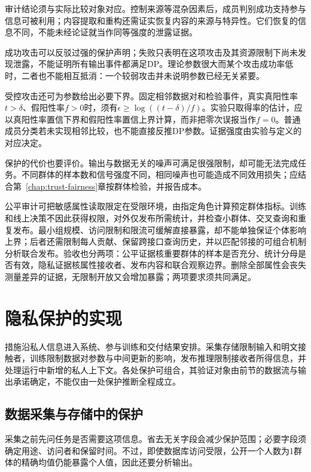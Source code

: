 审计结论须与实际比较对象对应。控制来源等混杂因素后，成员判别成功支持参与信息可被利用；内容提取和重构还需证实恢复内容的来源与特异性。它们恢复的信息不同，不能未经论证就当作同等强度的泄露证据。

成功攻击可以反驳过强的保护声明；失败只表明在这项攻击及其资源限制下尚未发现泄露，不能证明所有输出事件都满足DP。理论参数很大而某个攻击成功率低时，二者也不能相互抵消：一个较弱攻击并未说明参数已经无关紧要。

受控攻击还可为参数给出必要下界。固定相邻数据对和检验事件，真实真阳性率$t>\delta$、假阳性率$f>0$时，须有$\epsilon\geq\log((t-\delta)/f)$。实验只取得率的估计，应以真阳性率置信下界和假阳性率置信上界计算，而非把零次误报当作$f=0$。普通成员分类若未实现相邻比较，也不能直接反推DP参数。证据强度由实验与定义的对应决定。

保护的代价也要评价。输出与数据无关的噪声可满足很强限制，却可能无法完成任务。不同群体的样本数和信号强度不同，相同噪声也可能造成不同效用损失；应结合第~\ref{chap:trust-fairness}章按群体检验，并报告成本。

公平审计可把敏感属性读取限定在受限环境，由指定角色计算预定群体指标。训练和线上决策不因此获得权限，对外仅发布所需统计，并检查小群体、交叉查询和重复发布。最小组规模、访问限制和限流可缓解直接暴露，却不能单独保证个体影响上界；后者还需限制每人贡献、保留跨接口查询历史，并以匹配邻接的可组合机制分析联合发布。验收也分两项：公平证据核重要群体的样本是否充分、统计分母是否有效，隐私证据核属性接收者、发布内容和联合观察边界。删除全部属性会丧失测量差异的证据，无限制开放又会增加暴露；两项要求须共同满足。

\section{隐私保护的实现}
\label{sec:privacy-use}

措施沿私人信息进入系统、参与训练和交付结果安排。采集存储限制输入和明文接触者，训练限制数据对参数与中间更新的影响，发布推理限制接收者所得信息，并处理运行中新增的私人上下文。各处保护可组合，其验证对象由前节的数据流与输出承诺确定，不能仅由一处保护推断全程成立。

\subsection{数据采集与存储中的保护}
\label{sec:privacy-collection}

采集之前先问任务是否需要这项信息。省去无关字段会减少保护范围；必要字段须确定用途、访问者和保留时间。不过，即使数据库访问受限，公开一个人数为1群体的精确均值仍能暴露个人值，因此还要分析输出。


